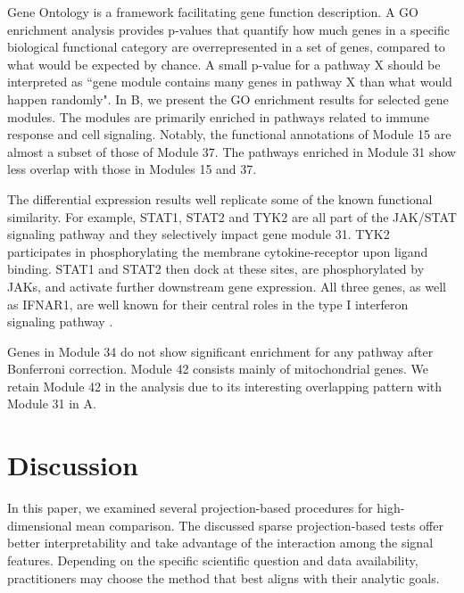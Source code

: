 \documentclass[11pt]{article}
\newenvironment{revblock}
  {\color{teal}}
  {}
\begin{document}
\begin{revblock}
Gene Ontology is a framework facilitating gene function description. A GO enrichment analysis provides p-values that quantify how much genes in a specific biological functional category are overrepresented in a set of genes, compared to what would be expected by chance. A small p-value for a pathway X should be interpreted as ``gene module contains many genes in pathway X than what would happen randomly". In B, we present the GO enrichment results for selected gene modules. The modules are primarily enriched in pathways related to immune response and cell signaling. Notably, the functional annotations of Module 15 are almost a subset of those of Module 37. The pathways enriched in Module 31 show less overlap with those in Modules 15 and 37. 

The differential expression results well replicate some of the known functional similarity. For example, STAT1, STAT2 and TYK2 are all part of the JAK/STAT signaling pathway \citep{rawlings2004jak, hu2021jak} and they selectively impact gene module 31. TYK2 participates in phosphorylating the membrane cytokine-receptor upon ligand binding. STAT1 and STAT2 then dock at these sites, are phosphorylated by JAKs, and activate further downstream gene expression. All three genes, as well as IFNAR1, are well known for their central roles in the type I interferon signaling pathway \citep{velazquez1992protein,qureshi1995tyrosine,prchal2012tyk2}.

Genes in Module 34 do not show significant enrichment for any pathway after Bonferroni correction. Module 42 consists mainly of mitochondrial genes. We retain Module 42 in the analysis due to its interesting overlapping pattern with Module 31 in A.
\end{revblock}


\section{Discussion}
\label{section: discussion}
In this paper, we examined several projection-based procedures for high-dimensional mean comparison. The discussed sparse projection-based tests offer better interpretability and take advantage of the interaction among the signal features. Depending on the specific scientific question and data availability, practitioners may choose the method that best aligns with their analytic goals.
\end{document}
